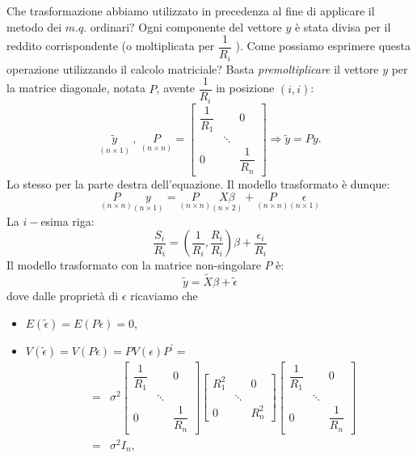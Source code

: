 \documentclass[a4paper]{report}
\theoremstyle{remark}
\begin{document}
\begin{enumerate}
Che trasformazione abbiamo utilizzato in precedenza al fine di applicare il
metodo dei $m.q.$ ordinari? Ogni componente del vettore $y$ \`{e} stata
divisa per il reddito corrispondente (o moltiplicata per $\dfrac{1}{R_{i}}$%
). Come possiamo esprimere questa operazione utilizzando il calcolo
matriciale? Basta \textit{premoltiplicare} il vettore $y$ per la matrice
diagonale, notata $P$, avente $\dfrac{1}{R_{i}}$ in posizione $(i,i)$: 
\begin{equation*}
\underset{(n\times 1)}{\tilde{y}}\ ,\ \underset{(n\times n)}{P}=\left[ 
\begin{array}{lll}
\dfrac{1}{R_{1}} &  & 0 \\ 
& \ddots &  \\ 
0 &  & \dfrac{1}{R_{n}}%
\end{array}%
\right] \Rightarrow \tilde{y}=Py.
\end{equation*}%
Lo stesso per la parte destra dell'equazione. Il modello trasformato \`{e}
dunque: 
\begin{equation*}
\underset{(n\times n)}{P}\underset{(n\times 1)}{y}=\underset{(n\times n)}{P}%
\underset{(n\times 2)}{X\beta }+\underset{(n\times n)}{P}\underset{(n\times
1)}{\epsilon }
\end{equation*}%
La $i-$esima riga: 
\begin{equation*}
\dfrac{S_{i}}{R_{i}}=\left( \dfrac{1}{R_{i}},\dfrac{R_{i}}{R_{i}}\right)
\beta +\dfrac{\epsilon _{i}}{R_{i}}
\end{equation*}%
Il modello trasformato con la matrice non-singolare $P$ \`{e}: 
\begin{equation*}
\tilde{y}=\tilde{X}\beta +\tilde{\epsilon}
\end{equation*}%
dove dalle propriet\`{a} di $\epsilon $ ricaviamo che

\begin{itemize}
\item $E(\tilde{\epsilon})=E(P\epsilon )=0$,

\item $V(\tilde{\epsilon})=V(P\epsilon )=PV(\epsilon )P^{\prime }=$ 
\begin{eqnarray*}
&=&\sigma ^{2}\left[ 
\begin{array}{lll}
\dfrac{1}{R_{1}} &  & 0 \\ 
& \ddots &  \\ 
0 &  & \dfrac{1}{R_{n}}%
\end{array}%
\right] \left[ 
\begin{array}{lll}
R_{1}^{2} &  & 0 \\ 
& \ddots &  \\ 
0 &  & R_{n}^{2}%
\end{array}%
\right] \left[ 
\begin{array}{lll}
\dfrac{1}{R_{1}} &  & 0 \\ 
& \ddots &  \\ 
0 &  & \dfrac{1}{R_{n}}%
\end{array}%
\right] \\
&=&\sigma ^{2}I_{n},
\end{eqnarray*}
\end{itemize}


\end{enumerate}
\end{document}
